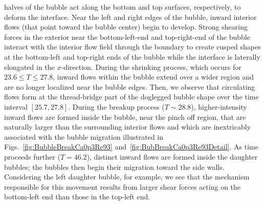 \documentclass[%
 reprint,
 showkeys,
 amsmath,amssymb,
 aps,
 prfluids,
 onecolumn
]{revtex4-2}
\begin{document}
halves of the bubble act along the bottom and top surfaces, respectively, to
deform the interface.  Near the left and right edges of the bubble, inward
interior flows (that point toward the bubble center) begin to develop.  Strong
shearing forces in the exterior near the bottom-left-end and top-right-end of
the bubble interact with the interior flow field through the boundary to create
cusped shapes at the bottom-left and top-right ends of the bubble while the
interface is laterally elongated in the $x$-direction.  During the shrinking
process, which occurs for $23.6 \leq T \leq 27.8$, inward flows within the
bubble extend over a wider region and are no longer localized near the bubble
edges.  Then, we observe that circulating flows form at the thread-bridge part
of the doglegged bubble shape over the time interval $[25.7, 27.8]$.  During
the breakup process ($T \sim 28.8$), higher-intensity inward flows are formed
inside the bubble, near the pinch off region, that are naturally larger than
the surrounding interior flows and which are inextricably associated with the
bubble migration illustrated in Figs.~\ref{fig:BubbleBreakCa0p3Re93}
and~\ref{fig:BubBreakCa0p3Re93Detail}.  As time proceeds further ($T =  46.2$),
distinct inward flows are formed inside the daughter bubbles; the bubbles then
begin their migration toward the side walls.  Considering the left daughter
bubble, for example, we see that the mechanism responsible for this movement
results from larger shear forces acting on the bottom-left end than those in
the top-left end.
\end{document}
